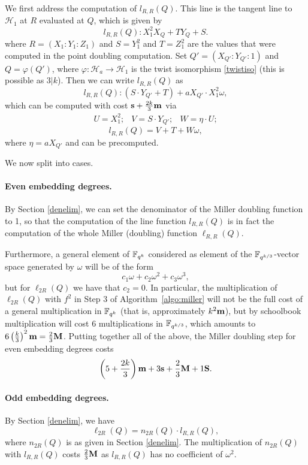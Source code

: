 We first address the computation of $l_{R,R}(Q)$.
This line is the tangent line to $\mathcal{H}_1$ at $R$ evaluated at $Q$, 
which is given by
\[l_{R,R}(Q): X_1^2 X_Q + T Y_Q + S.\]
where $R = (X_1:Y_1:Z_1)$ 
and $S=Y_1^2$ and $T=Z_1^2$ are the values 
that were computed in the point doubling computation.
Set $Q' = (X_{Q'}:Y_{Q'}:1)$ and $Q = \varphi(Q')$, where
$\varphi : \mathcal{H}_a \rightarrow \mathcal{H}_1$ 
is the twist isomorphism \eqref{twistiso}
(this is possible as $3|k$).
Then we can write $l_{R,R}(Q)$ as
\[l_{R,R}(Q): (S \cdot Y_{Q'} + T) + a X_{Q'} \cdot X_1^2 \omega,\]
which can be computed with cost $\textbf{s} + \frac{2k}{3}\textbf{m}$ via
\[\begin{array}{ccc}
U = X_1^2; & V = S \cdot Y_{Q'}; & W = \eta \cdot U;
\end{array}\]
\[l_{R,R}(Q)= V+T + W\omega,\]
where $\eta = aX_{Q'}$ and can be precomputed.

We now split into cases.

\paragraph*{Even embedding degrees.}

By Section \ref{denelim}, we can set the denominator of the Miller doubling function to 1, so that the computation of the line function $l_{R,R}(Q)$ is in fact
the computation of the whole Miller (doubling) function $\ell_{R,R}(Q)$.

Furthermore, a general element of $\mathbb{F}_{q^k}$ considered as element of the 
$\mathbb{F}_{q^{k/3}}$-vector space generated
by $\omega$ will be of the form 
\[c_1 \omega + c_2 \omega^2 + c_3 \omega^3,\]
but for $\ell_{2R}(Q)$ we have that $c_2 = 0$. 
In particular, the multiplication of $\ell_{2R}(Q)$ with $f^2$ in
Step 3 of Algorithm~\ref{algo:miller} will not be the full cost of a general multiplication in $\mathbb{F}_{q^k}$ (that
is, approximately $k^2\textbf{m}$), 
but by schoolbook multiplication will cost 6 multiplications in $\mathbb{F}_{q^{k/3}}$, 
which amounts to 
$6 \left(\frac{k}{3}\right)^2 \textbf{m} = \frac{2}{3} \textbf{M}$.
Putting together all of the above, the Miller doubling step for even
embedding degrees costs
\[\left( 5 + \frac{2k}{3}\right)\textbf{m} + 3\textbf{s} + \frac{2}{3}\textbf{M} + 1\textbf{S}.\]

\paragraph*{Odd embedding degrees.}

By Section \ref{denelim}, we have
\[\ell_{2R}(Q) = n_{2R}(Q) \cdot l_{R,R}(Q),\]
where $n_{2R}(Q)$ is as given in Section \ref{denelim}.
The multiplication of $n_{2R}(Q)$ with $l_{R,R}(Q)$ 
costs $\frac{2}{3}\textbf{M}$ 
as $l_{R,R}(Q)$ has no coefficient of $\omega^2$.

